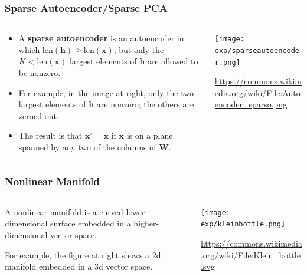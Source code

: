 \documentclass{beamer}
\begin{document}
\begin{frame}
  \frametitle{Sparse Autoencoder/Sparse PCA}
  \begin{columns}
    \begin{column}{0.7\textwidth}
      \begin{itemize}
        \item A \textbf{sparse autoencoder} is an autoencoder in
        which $\text{len}(\bm{h})\ge\text{len}(\bm{x})$, but only the
        $K<\text{len}(\bm{x})$ largest elements of $\bm{h}$ are
        allowed to be nonzero.
      \item 
        For example, in the image at right, only the two largest
        elements of $\bm{h}$ are nonzero; the others are zeroed out.
      \item 
        The result is that $\bm{x'}=\bm{x}$ if $\bm{x}$ is on a
        plane spanned by any two of the columns of $\bm{W}$.
      \end{itemize}
    \end{column}
    \begin{column}{0.3\textwidth}
      \texttt{[image: exp/sparseautoencoder.png]}

      \url{https://commons.wikimedia.org/wiki/File:Autoencoder_sparso.png}
    \end{column}
  \end{columns}
\end{frame}

\begin{frame}
  \frametitle{Nonlinear Manifold}
  \begin{columns}
    \begin{column}{0.5\textwidth}
      A nonlinear manifold is a curved lower-dimensional surface
      embedded in a higher-dimensional vector space.

      For example, the figure at right shows a 2d manifold embedded in
      a 3d vector space.
    \end{column}
    \begin{column}{0.5\textwidth}
      \texttt{[image: exp/kleinbottle.png]}

      \url{https://commons.wikimedia.org/wiki/File:Klein_bottle.svg}
    \end{column}
  \end{columns}
\end{frame}
\end{document}
